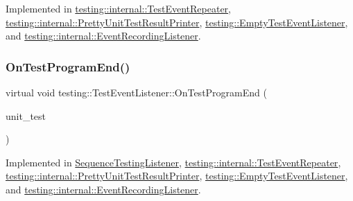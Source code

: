 Implemented in \mbox{\hyperlink{classtesting_1_1internal_1_1TestEventRepeater_ac8fb21da6802b1ebab9cad3eee9150eb}{testing\+::internal\+::\+Test\+Event\+Repeater}}, \mbox{\hyperlink{classtesting_1_1internal_1_1PrettyUnitTestResultPrinter_a7589e8df7485349498a3a81bf16e2f68}{testing\+::internal\+::\+Pretty\+Unit\+Test\+Result\+Printer}}, \mbox{\hyperlink{classtesting_1_1EmptyTestEventListener_a59e7f7d9f2e2d089a6e8c1e2577f4718}{testing\+::\+Empty\+Test\+Event\+Listener}}, and \mbox{\hyperlink{classtesting_1_1internal_1_1EventRecordingListener_a4a6685d894923f1691ad9c6a4311470e}{testing\+::internal\+::\+Event\+Recording\+Listener}}.

\mbox{\label{classtesting_1_1TestEventListener_ad15b6246d94c268e233487a86463ef3d}} 
\subsubsection{\texorpdfstring{OnTestProgramEnd()}{OnTestProgramEnd()}}
{\footnotesize\ttfamily virtual void testing\+::\+Test\+Event\+Listener\+::\+On\+Test\+Program\+End (\begin{DoxyParamCaption}\item[{const \mbox{\hyperlink{classtesting_1_1UnitTest}{Unit\+Test}} \&}]{unit\+\_\+test }\end{DoxyParamCaption})\hspace{0.3cm}{\ttfamily [pure virtual]}}



Implemented in \mbox{\hyperlink{classSequenceTestingListener_aacac5e15bac089460841ff63a5c31f57}{Sequence\+Testing\+Listener}}, \mbox{\hyperlink{classtesting_1_1internal_1_1TestEventRepeater_a4622616259747dbcc23f5ee39ef99ec0}{testing\+::internal\+::\+Test\+Event\+Repeater}}, \mbox{\hyperlink{classtesting_1_1internal_1_1PrettyUnitTestResultPrinter_a8c92c062889abdb940b04ffe113f5980}{testing\+::internal\+::\+Pretty\+Unit\+Test\+Result\+Printer}}, \mbox{\hyperlink{classtesting_1_1EmptyTestEventListener_a0abcc02bd2331a2e29ad6f4d9daf2a32}{testing\+::\+Empty\+Test\+Event\+Listener}}, and \mbox{\hyperlink{classtesting_1_1internal_1_1EventRecordingListener_a21fe9c3c519c4599a48b16ddfb734aa3}{testing\+::internal\+::\+Event\+Recording\+Listener}}.

\mbox{\label{classtesting_1_1TestEventListener_a5f6c84f39851e8a603a2d2e10063816b}} 
